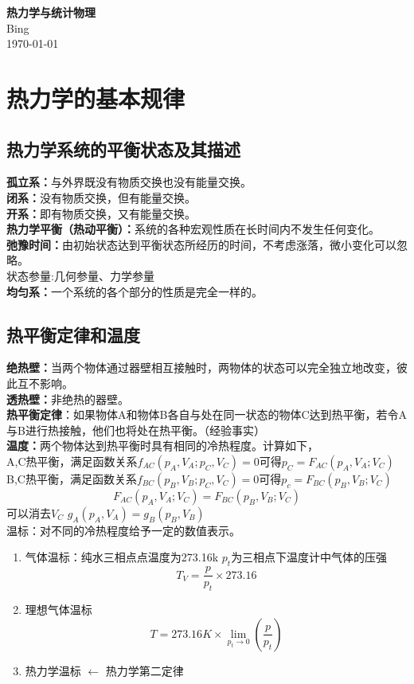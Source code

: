\documentclass[12pt,a4paper]{article}
\begin{document}
\begin{center}
    {\LARGE \textbf{热力学与统计物理}}\\[0.5em]
    {\large Bing }\\[0.3em]
    {\normalsize \today}
\end{center}

\vspace{1em}

\tableofcontents
\newpage

\section{热力学的基本规律}
\subsection{热力学系统的平衡状态及其描述}
\textbf{孤立系：}与外界既没有物质交换也没有能量交换。\\
\textbf{闭系：}没有物质交换，但有能量交换。\\
\textbf{开系：}即有物质交换，又有能量交换。\\
\textbf{热力学平衡（热动平衡）：}系统的各种宏观性质在长时间内不发生任何变化。\\
\textbf{弛豫时间：}由初始状态达到平衡状态所经历的时间，不考虑涨落，微小变化可以忽略。\\
状态参量:几何参量、力学参量\\
\textbf{均匀系：}一个系统的各个部分的性质是完全一样的。

\subsection{热平衡定律和温度}
\textbf{绝热壁：}当两个物体通过器壁相互接触时，两物体的状态可以完全独立地改变，彼此互不影响。\\
\textbf{透热壁：}非绝热的器壁。\\
\textbf{热平衡定律}：如果物体A和物体B各自与处在同一状态的物体C达到热平衡，若令A与B进行热接触，他们也将处在热平衡。（经验事实）\\
\textbf{温度：}两个物体达到热平衡时具有相同的冷热程度。计算如下，\\
A,C热平衡，满足函数关系\(f_{AC}(p_A,V_A;p_C,V_C)=0\)可得\(p_C=F_{AC}(p_A,V_A;V_C)\)\\
B,C热平衡，满足函数关系\(f_{BC}(p_B,V_B;p_C,V_C)=0\)可得\(p_c=F_{BC}(p_B,V_B;V_C)\)\\
\[
F_{AC}(p_A,V_A;V_C)=F_{BC}(p_B,V_B;V_C)
\]
可以消去\(V_C\) \quad \(g_A(p_A,V_A)=g_B(p_B,V_B)\)\\
温标：对不同的冷热程度给予一定的数值表示。
\begin{enumerate}
    \item 气体温标：纯水三相点点温度为273.16k
    \(p_t\)为三相点下温度计中气体的压强
    \[
    T_V=\frac{p}{p_t}\times 273.16
    \]
    \item 理想气体温标
    \[
    T=273.16K\times \lim_{p_t\rightarrow0}(\frac{p}{p_t})
    \]
    \item 热力学温标 \(\leftarrow\) 热力学第二定律
\end{enumerate}
\end{document}

